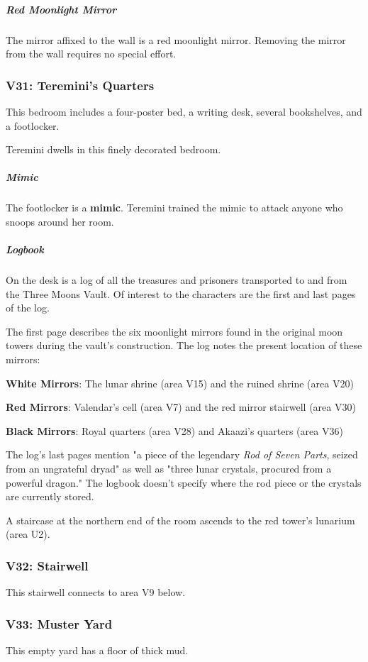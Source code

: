 \documentclass[10pt,a4paper,twoside,bg=print,twocolumn,openany,nodeprecatedcode]{dndbook}
\begin{document}
\subparagraph{Red Moonlight Mirror}
The mirror affixed to the wall is a red moonlight mirror. Removing the mirror from the wall requires no special effort.

\subsubsection{V31: Teremini's Quarters}
\begin{DndReadAloud}{}
This bedroom includes a four-poster bed, a writing desk, several bookshelves, and a footlocker.

\end{DndReadAloud}

Teremini dwells in this finely decorated bedroom.

\subparagraph{Mimic}
The footlocker is a \textbf{mimic}. Teremini trained the mimic to attack anyone who snoops around her room.

\subparagraph{Logbook}
On the desk is a log of all the treasures and prisoners transported to and from the Three Moons Vault. Of interest to the characters are the first and last pages of the log.

The first page describes the six moonlight mirrors found in the original moon towers during the vault's construction. The log notes the present location of these mirrors:

\textbf{White Mirrors}: The lunar shrine (area V15) and the ruined shrine (area V20)

\textbf{Red Mirrors}: Valendar's cell (area V7) and the red mirror stairwell (area V30)

\textbf{Black Mirrors}: Royal quarters (area V28) and Akaazi's quarters (area V36)

The log's last pages mention "a piece of the legendary \textit{Rod of Seven Parts}, seized from an ungrateful dryad" as well as "three lunar crystals, procured from a powerful dragon." The logbook doesn't specify where the rod piece or the crystals are currently stored.

A staircase at the northern end of the room ascends to the red tower's lunarium (area U2).

\subsubsection{V32: Stairwell}
This stairwell connects to area V9 below.

\subsubsection{V33: Muster Yard}
\begin{DndReadAloud}{}
This empty yard has a floor of thick mud.

\end{DndReadAloud}
\end{document}
